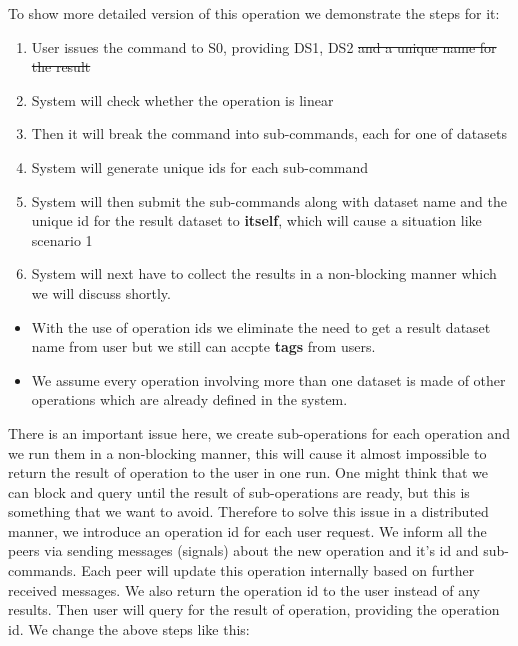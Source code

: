 To show more detailed version of this operation we demonstrate the steps for it:

\begin{enumerate}
\item User issues the command to S0, providing DS1, DS2 \st{and a unique name for the result}
\item System will check whether the operation is linear
\item Then it will break the command into sub-commands, each for one of datasets
\item System will generate unique ids for each sub-command
\item System will then submit the sub-commands along with dataset name and the unique id for the result dataset
to \textbf{itself}, which will cause a situation like scenario 1
\item System will next have to collect the results in a non-blocking manner which we will discuss shortly.
\end{enumerate}

\begin{itemize}
\item With the use of operation ids we eliminate the need to get a result dataset name from user but we still can accpte \textbf{tags} from users.
\end{itemize}

\begin{itemize}
\item We assume every operation involving more than one dataset is made of other operations which are already defined in the system.
\end{itemize}

There is an important issue here, we create sub-operations for each operation and we run them in a non-blocking manner, this will
cause it almost impossible to return the result of operation to the user in one run. One might think that we can block and query
until the result of sub-operations are ready, but this is something that we want to avoid. Therefore to solve this issue in a 
distributed manner, we introduce an operation id for each user request. We inform all the peers via sending messages (signals) about
the new operation and it's id and sub-commands. Each peer will update this operation internally based on further received messages.
We also return the operation id to the user instead of any results. Then user will query for the result of operation, providing the 
operation id. We change the above steps like this:


